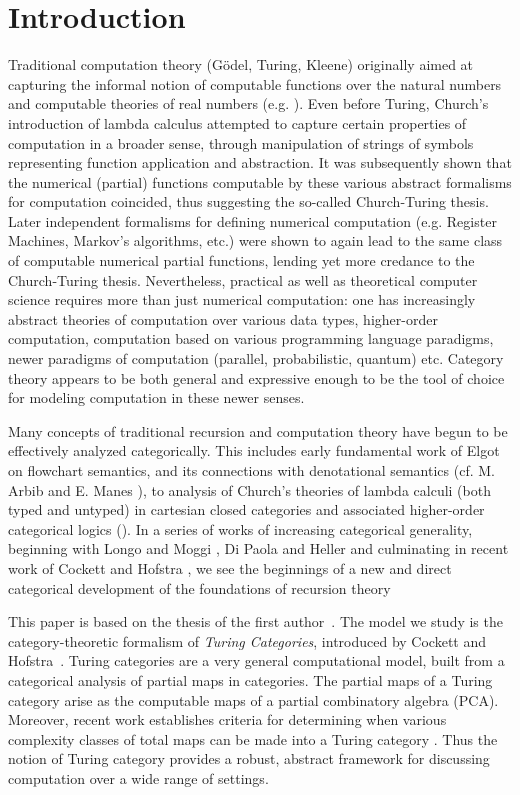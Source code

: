 \documentclass{entcs} \usepackage{entcsmacro}
\begin{document}
\section{Introduction}\label{intro}

Traditional computation theory (G\"odel, Turing, Kleene) originally aimed at capturing the 
informal notion of computable functions over the natural numbers and computable theories of real numbers
(e.g. \cite{Turing-Paper,IMM}).  Even before Turing, Church's introduction of lambda calculus \cite{Church}  attempted to capture certain properties of computation in a broader sense,
through manipulation of strings of symbols representing function application and abstraction. It was subsequently shown that the
numerical (partial) functions computable by these various abstract formalisms for computation coincided, thus suggesting the so-called Church-Turing thesis.  Later independent formalisms
for defining numerical computation (e.g. Register Machines, Markov's algorithms, etc.) were shown to again lead to the same class of computable numerical partial functions, lending yet more credance to the Church-Turing thesis.  Nevertheless, practical as well as theoretical computer science requires more than just numerical computation:  one has increasingly abstract theories of computation over various data types, higher-order computation, computation based on various programming language paradigms, newer paradigms of computation (parallel, probabilistic, quantum) etc.  Category theory appears to be both general and expressive enough to be 
the tool of choice for modeling computation in these newer senses. 

Many concepts of traditional recursion and computation theory have begun to be effectively analyzed categorically.  This includes early fundamental work of Elgot on flowchart semantics,
and its connections with denotational semantics  (cf.  M. Arbib and E. Manes \cite{MA}), to 
analysis of Church's theories of lambda calculi (both typed and untyped) in cartesian closed categories and associated higher-order categorical logics (\cite{HOCL}).  In a series of works
of increasing categorical generality, beginning with Longo and Moggi \cite{LMog}, Di Paola and Heller \cite{DiPao} and culminating in recent work of Cockett and Hofstra \cite{Turing}, we see the beginnings of a new and direct categorical development of the foundations of recursion theory 


This paper is based on the thesis of the first author~\cite{MyPhD}.
The model we study is the category-theoretic formalism of \emph{Turing Categories}, introduced by Cockett and Hofstra~\cite{Turing}. Turing categories are a very general computational model, built from a categorical analysis of 
partial maps in categories. The partial maps of a Turing category arise as the computable maps of a partial combinatory algebra (PCA).  Moreover,  recent work establishes criteria for 
determining when various complexity classes of total maps  can be made into a Turing category
\cite{Total}.  Thus the notion of Turing category provides a robust, abstract framework for discussing computation over a wide range of settings. 
\end{document}
